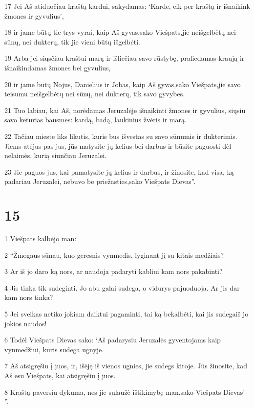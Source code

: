 \par 17 Jei Aš atiduočiau kraštą kardui, sakydamas: ‘Karde, eik per kraštą ir išnaikink žmones ir gyvulius’, 
\par 18 ir jame būtų tie trys vyrai, kaip Aš gyvas,­sako Viešpats,­jie neišgelbėtų nei sūnų, nei dukterų, tik jie vieni būtų išgelbėti. 
\par 19 Arba jei siųsčiau kraštui marą ir išliečiau savo rūstybę, praliedamas kraują ir išnaikindamas žmones bei gyvulius, 
\par 20 ir jame būtų Nojus, Danielius ir Jobas, kaip Aš gyvas,­sako Viešpats,­jie savo teisumu neišgelbėtų nei sūnų, nei dukterų, tik savo gyvybes. 
\par 21 Tuo labiau, kai Aš, norėdamas Jeruzalėje išnaikinti žmones ir gyvulius, siųsiu savo keturias bausmes: kardą, badą, laukinius žvėris ir marą. 
\par 22 Tačiau mieste liks likutis, kuris bus išvestas su savo sūnumis ir dukterimis. Jiems atėjus pas jus, jūs matysite jų kelius bei darbus ir būsite paguosti dėl nelaimės, kurią siunčiau Jeruzalei. 
\par 23 Jie paguos jus, kai pamatysite jų kelius ir darbus, ir žinosite, kad visa, ką padariau Jeruzalei, nebuvo be priežasties,­sako Viešpats Dievas”.



\chapter{15}


\par 1 Viešpats kalbėjo man: 
\par 2 “Žmogaus sūnau, kuo geresnis vynmedis, lyginant jį su kitais medžiais? 
\par 3 Ar iš jo daro ką nors, ar naudoja padaryti kabliui kam nors pakabinti? 
\par 4 Jis tinka tik sudeginti. Jo abu galai sudega, o vidurys pajuoduoja. Ar jis dar kam nors tinka? 
\par 5 Jei sveikas netiko jokiam daiktui pagaminti, tai ką bekalbėti, kai jis sudega­iš jo jokios naudos! 
\par 6 Todėl Viešpats Dievas sako: ‘Aš padarysiu Jeruzalės gyventojams kaip vynmedžiui, kuris sudega ugnyje. 
\par 7 Aš atsigręšiu į juos, ir, išėję iš vienos ugnies, jie sudegs kitoje. Jūs žinosite, kad Aš esu Viešpats, kai atsigręšiu į juos. 
\par 8 Kraštą paversiu dykuma, nes jie sulaužė ištikimybę man,­sako Viešpats Dievas’ ”.



